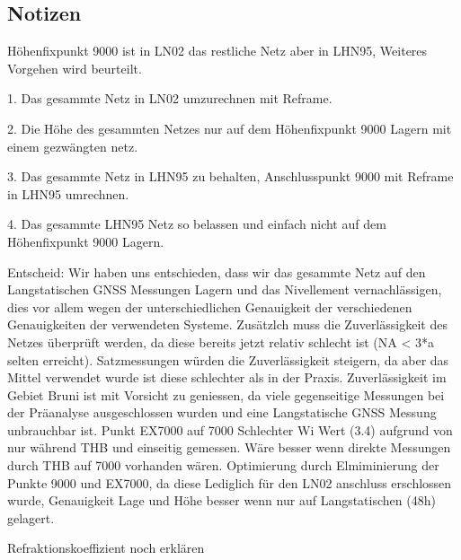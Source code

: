 \subsection{Notizen}
\label{sec:notizen}
Höhenfixpunkt 9000 ist in LN02 das restliche Netz aber in LHN95, Weiteres Vorgehen wird beurteilt.

1. Das gesammte Netz in LN02 umzurechnen mit Reframe.

2. Die Höhe des gesammten Netzes nur auf dem Höhenfixpunkt 9000 Lagern mit einem gezwängten netz.

3. Das gesammte Netz in LHN95 zu behalten, Anschlusspunkt 9000 mit Reframe in LHN95 umrechnen.

4. Das gesammte LHN95 Netz so belassen und einfach nicht auf dem Höhenfixpunkt 9000 Lagern.

\bigskip 
Entscheid: Wir haben uns entschieden, dass wir das gesammte Netz auf den Langstatischen GNSS Messungen 
Lagern und das Nivellement vernachlässigen, dies vor allem wegen der unterschiedlichen Genauigkeit der
verschiedenen Genauigkeiten der verwendeten Systeme. Zusätzlch muss die Zuverlässigkeit des Netzes
überprüft werden, da diese bereits jetzt relativ schlecht ist (NA < 3*a selten erreicht). Satzmessungen
würden die Zuverlässigkeit steigern, da aber das Mittel verwendet wurde ist diese schlechter als in der 
Praxis. Zuverlässigkeit im Gebiet Bruni ist mit Vorsicht zu geniessen, da viele gegenseitige Messungen 
bei der Präanalyse ausgeschlossen wurden und eine Langstatische GNSS Messung unbrauchbar ist.
\bigskip
Punkt EX7000 auf 7000 Schlechter Wi Wert (3.4) aufgrund von nur während THB und einseitig gemessen. Wäre besser wenn direkte 
Messungen durch THB auf 7000 vorhanden wären. 
\bigskip
Optimierung durch Elmiminierung der Punkte 9000 und EX7000, da diese Lediglich für den LN02 anschluss 
erschlossen wurde, Genauigkeit Lage und Höhe besser wenn nur auf Langstatischen (48h) gelagert.
\bigskip
\bigskip

Refraktionskoeffizient noch erklären

\FloatBarrier
